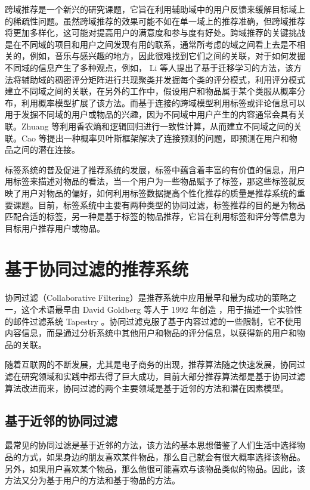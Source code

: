 跨域推荐是一个新兴的研究课题，它旨在利用辅助域中的用户反馈来缓解目标域上的稀疏性问题\cite{hu2013personalized}。虽然跨域推荐的效果可能不如在单一域上的推荐准确，但跨域推荐将更加多样化，这可能对提高用户的满意度和参与度有好处。跨域推荐的关键挑战是在不同域的项目和用户之间发现有用的联系，通常所考虑的域之间看上去是不相关的，例如，音乐与感兴趣的地方，因此很难找到它们之间的关联\cite{shi2011tags}，对于如何发掘不同域的信息产生了多种观点，例如，
Li 等人提出了基于迁移学习的方法\cite{li2009can}，该方法将辅助域的稠密评分矩阵进行共现聚类并发掘每个类的评分模式，利用评分模式建立不同域之间的关联，在另外的工作中\cite{li2009transfer}，假设用户和物品属于某个类服从概率分布，利用概率模型扩展了该方法。而基于连接的跨域模型利用标签或评论信息可以用于发掘不同域的用户或物品的兴趣\cite{kaminskas2011location,Enrich2013Cold,Xin2015Cross}，因为不同域中用户产生的内容通常会具有关联。Zhuang \cite{zhuang2010cross} 等利用香农熵和逻辑回归进行一致性计算，从而建立不同域之间的关联。Cao \cite{cao2010transfer} 等提出一种概率贝叶斯框架解决了连接预测的问题，即预测在用户和物品之间的潜在连接。


标签系统的普及促进了推荐系统的发展，标签中蕴含着丰富的有价值的信息，用户用标签来描述对物品的看法，当一个用户为一些物品赋予了标签，那这些标签就反映了用户对物品的偏好\cite{chen2016capturing}，如何利用标签数据提高个性化推荐的质量是推荐系统的重要课题\cite{项亮2012推荐系统实践}。目前，标签系统中主要有两种类型的协同过滤，标签推荐\cite{wang2013collaborative,fang2015personalized}的目的是为物品匹配合适的标签，另一种是基于标签的物品推荐\cite{zhou2010userrec,xu2011semrec}，它旨在利用标签和评分等信息为目标用户推荐用户或物品。

\section{基于协同过滤的推荐系统}
协同过滤（Collaborative Filtering）是推荐系统中应用最早和最为成功的策略之一，这个术语最早由 David Goldberg 等人于 1992 年创造 ，用于描述一个实验性的邮件过滤系统 Tapestry \cite{Goldberg1992Using}。协同过滤克服了基于内容过滤的一些限制，它不使用内容信息，而是通过分析系统中其他用户和物品的评分信息，以获得新的用户和物品的关联。

随着互联网的不断发展，尤其是电子商务的出现，推荐算法随之快速发展，协同过滤在研究领域和实践中都去得了巨大成功，目前大部分推荐算法都是基于协同过滤算法改进而来，协同过滤的两个主要领域是基于近邻的方法和潜在因素模型。

\subsection{基于近邻的协同过滤}
最常见的协同过滤是基于近邻的方法，该方法的基本思想借鉴了人们生活中选择物品的方式，如果身边的朋友喜欢某件物品，那么自己就会有很大概率选择该物品。另外，如果用户喜欢某个物品，那么他很可能喜欢与该物品类似的物品。因此，该方法又分为基于用户的方法和基于物品的方法。

